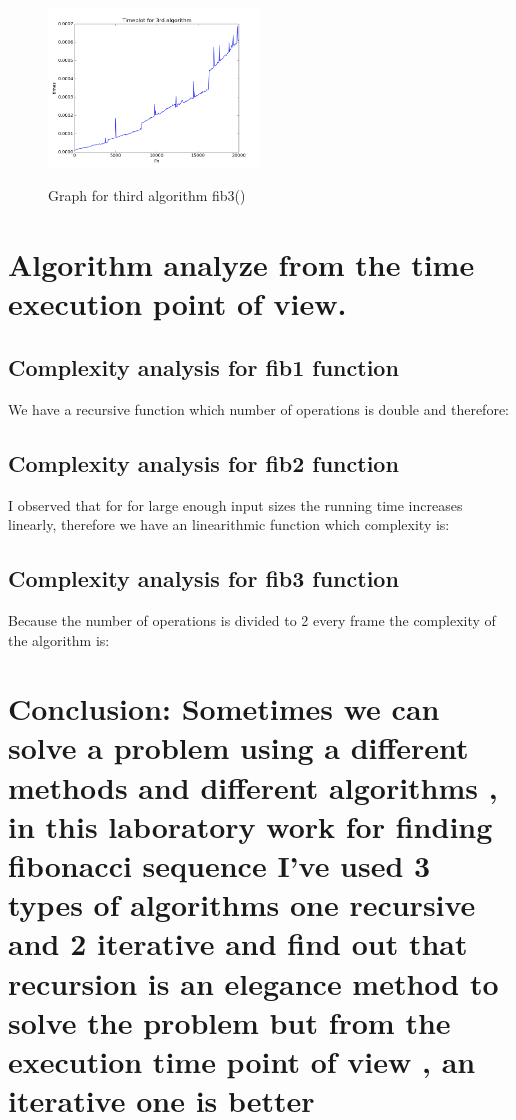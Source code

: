 \documentclass[12pt]{article}
\begin{document}
\begin{figure}[h!]
  \centering
    {%
      \includegraphics[width=0.5\textwidth]{figure_3}}
  \caption{Graph for third algorithm fib3()}
\end{figure}

\section{Algorithm analyze from the time execution point of view.}
\subsection{Complexity analysis for fib1 function}
We have a recursive function which number of operations is double and therefore:

\begin{center}\end{center}

\subsection{Complexity analysis for fib2 function}
I observed that for  for large enough input sizes the running time increases linearly, therefore we have an linearithmic function which complexity is: 
\begin{center}\end{center}

\subsection{Complexity analysis for fib3 function}

Because the number of operations is divided to 2 every frame the complexity of the algorithm is: 

\begin{center}\end{center}


\section{Conclusion: Sometimes we can solve a problem using a different methods and different algorithms , in this laboratory work for finding fibonacci sequence I've used 3 types of algorithms one recursive and 2 iterative and find out that recursion is an elegance method to solve the problem but from the execution time point of view , an iterative one is better  }
\end{document}
